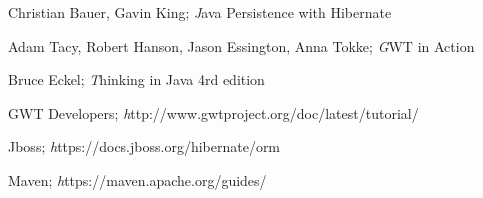 \begin{thebibliography}{99}

Christian Bauer, Gavin King;
\textit Java Persistence with Hibernate

Adam Tacy, Robert Hanson, Jason Essington, Anna Tokke;
\textit GWT in Action

Bruce Eckel;
\textit Thinking in Java 4rd edition

GWT Developers;
\textit http://www.gwtproject.org/doc/latest/tutorial/

Jboss;
\textit https://docs.jboss.org/hibernate/orm

Maven;
\textit https://maven.apache.org/guides/

\end{thebibliography}
